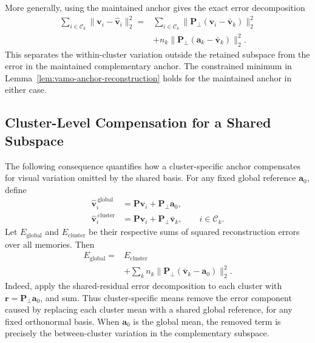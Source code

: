 More generally, using the maintained anchor gives the exact
error decomposition
\begin{equation*}
\begin{aligned}
    \sum_{i\in\mathcal{C}_k}
      \|\mathbf{v}_i-\hat{\mathbf{v}}_i\|_2^2
    ={}&
    \sum_{i\in\mathcal{C}_k}
      \|\mathbf{P}_{\perp}
      (\mathbf{v}_i-\bar{\mathbf{v}}_k)\|_2^2\\
    &+n_k\|\mathbf{P}_{\perp}
      (\mathbf{a}_k-\bar{\mathbf{v}}_k)\|_2^2.
\end{aligned}
\end{equation*}
This separates the within-cluster variation outside the retained
subspace from the error in the maintained complementary anchor.
The constrained minimum in
Lemma~\ref{lem:vamo-anchor-reconstruction} holds for the maintained
anchor in either case.

\subsection{Cluster-Level Compensation for a Shared Subspace}
\label{app:vamo-cluster-compensation}

The following consequence quantifies how a cluster-specific anchor
compensates for visual variation omitted by the shared basis.
For any fixed global reference $\mathbf{a}_0$, define
\begin{equation*}
\begin{aligned}
    \hat{\mathbf{v}}_i^{\,\mathrm{global}}
      &=\mathbf{P}\mathbf{v}_i+\mathbf{P}_{\perp}\mathbf{a}_0,\\
    \hat{\mathbf{v}}_i^{\,\mathrm{cluster}}
      &=\mathbf{P}\mathbf{v}_i+
        \mathbf{P}_{\perp}\bar{\mathbf{v}}_k,
        \qquad i\in\mathcal{C}_k.
\end{aligned}
\end{equation*}
Let $E_{\mathrm{global}}$ and $E_{\mathrm{cluster}}$ be their
respective sums of squared reconstruction errors over all memories.
Then
\begin{equation*}
\begin{aligned}
    E_{\mathrm{global}}
    ={}&E_{\mathrm{cluster}}\\
    &+\sum_k n_k
      \|\mathbf{P}_{\perp}(\bar{\mathbf{v}}_k-\mathbf{a}_0)\|_2^2.
\end{aligned}
\end{equation*}
Indeed, apply
the shared-residual error decomposition to each cluster
with $\mathbf{r}=\mathbf{P}_{\perp}\mathbf{a}_0$, and sum.
Thus cluster-specific means remove the error component caused by
replacing each cluster mean with a shared global reference, for any
fixed orthonormal basis.
When $\mathbf{a}_0$ is the global mean, the removed term is precisely
the between-cluster variation in the complementary subspace.

